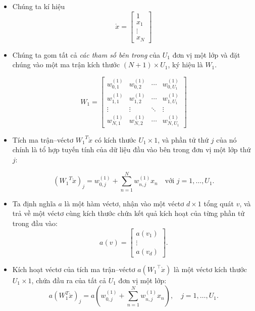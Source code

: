 \documentclass{book}
\begin{document}
    \begin{itemize}
        \item Chúng ta kí hiệu
        \[
        \mathring{x} =
        \begin{bmatrix}
        1 \\
        x_1 \\
        \vdots \\
        x_N
        \end{bmatrix}
        \]
        \item Chúng ta gom tất cả \textit{các tham số bên trong} của \( U_1 \) đơn vị một lớp và đặt chúng vào một ma trận kích thước \( (N+1) \times U_1 \), ký hiệu là \( W_1 \).

        \[
        W_1 = 
        \begin{bmatrix}
        w^{(1)}_{0,1} & w^{(1)}_{0,2} & \cdots & w^{(1)}_{0,U_1} \\
        w^{(1)}_{1,1} & w^{(1)}_{1,2} & \cdots & w^{(1)}_{1,U_1} \\
        \vdots        & \vdots        & \ddots & \vdots           \\
        w^{(1)}_{N,1} & w^{(1)}_{N,2} & \cdots & w^{(1)}_{N,U_1}
        \end{bmatrix}
        \]
        \item Tích ma trận–véctơ \( {W_1}^T \mathring{x} \) có kích thước \( U_1 \times 1 \), và phần tử thứ \( j \) của nó chính là tổ hợp tuyến tính của dữ liệu đầu vào bên trong đơn vị một lớp thứ \( j \):

        \[
        \left({W_1}^T \mathring{x}\right)_j = w^{(1)}_{0,j} + \sum_{n=1}^{N} w^{(1)}_{n,j} x_n \quad \text{với } j = 1, \dots, U_1.
        \]
        \item Ta định nghĩa \( a \) là một hàm véctơ, nhận vào một véctơ \( d \times 1 \) tổng quát \( v \), và trả về một véctơ cùng kích thước chứa kết quả kích hoạt của từng phần tử trong đầu vào:
        \[
        a(v) =
        \begin{bmatrix}
        a(v_1) \\
        \vdots \\
        a(v_d)
        \end{bmatrix}.
        \]
        
        \item Kích hoạt véctơ của tích ma trận–véctơ \( a\left({W_1}^\top \mathring{x}\right) \) là một véctơ kích thước \( U_1 \times 1 \), chứa đầu ra của tất cả \( U_1 \) đơn vị một lớp:
        \[
        a\left(W_{1}^{T} \mathring{x}\right)_j = a\left(w^{(1)}_{0,j} + \sum_{n=1}^N w^{(1)}_{n,j} x_n\right), \quad j = 1, \dots, U_1.
        \]
        

\end{itemize}
\end{document}
